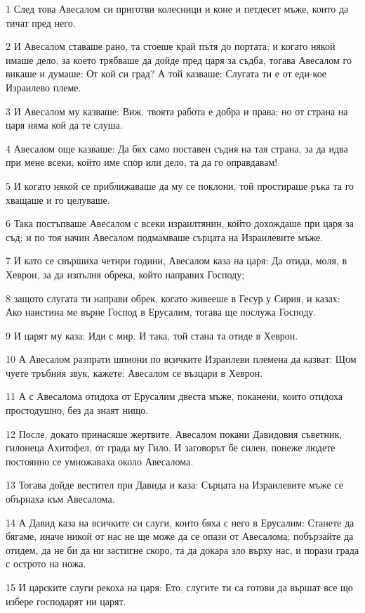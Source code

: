 \par 1 След това Авесалом си приготви колесници и коне и петдесет мъже, които да тичат пред него.
\par 2 И Авесалом ставаше рано, та стоеше край пътя до портата; и когато някой имаше дело, за което трябваше да дойде пред царя за съдба, тогава Авесалом го викаше и думаше: От кой си град? А той казваше: Слугата ти е от еди-кое Израилево племе.
\par 3 И Авесалом му казваше: Виж, твоята работа е добра и права; но от страна на царя няма кой да те слуша.
\par 4 Авесалом още казваше: Да бях само поставен съдия на тая страна, за да идва при мене всеки, който име спор или дело, та да го оправдавам!
\par 5 И когато някой се приближаваше да му се поклони, той простираше ръка та го хващаше и го целуваше.
\par 6 Така постъпваше Авесалом с всеки израилтянин, който дохождаше при царя за съд; и по тоя начин Авесалом подмамваше сърцата на Израилевите мъже.
\par 7 И като се свършиха четири години, Авесалом каза на царя: Да отида, моля, в Хеврон, за да изпълня обрека, който направих Господу;
\par 8 защото слугата ти направи обрек, когато живееше в Гесур у Сирия, и казах: Ако наистина ме върне Господ в Ерусалим, тогава ще послужа Господу.
\par 9 И царят му каза: Иди с мир. И така, той стана та отиде в Хеврон.
\par 10 А Авесалом разпрати шпиони по всичките Израилеви племена да казват: Щом чуете тръбния звук, кажете: Авесалом се възцари в Хеврон.
\par 11 А с Авесалома отидоха от Ерусалим двеста мъже, поканени, които отидоха простодушно, без да знаят нищо.
\par 12 После, докато принасяше жертвите, Авесалом покани Давидовия съветник, гилонеца Ахитофел, от града му Гило. И заговорът бе силен, понеже людете постоянно се умножаваха около Авесалома.
\par 13 Тогава дойде вестител при Давида и каза: Сърцата на Израилевите мъже се обърнаха към Авесалома.
\par 14 А Давид каза на всичките си слуги, които бяха с него в Ерусалим: Станете да бягаме, иначе никой от нас не ще може да се опази от Авесалома; побързайте да отидем, да не би да ни застигне скоро, та да докара зло върху нас, и порази града с острото на ножа.
\par 15 И царските слуги рекоха на царя: Ето, слугите ти са готови да вършат все що избере господарят ни царят.
